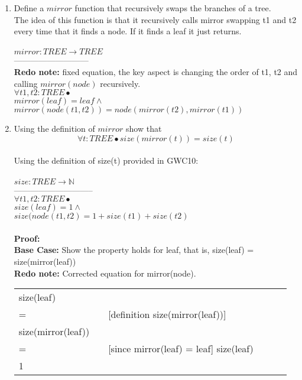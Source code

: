 \documentclass{article}
\begin{document}
\begin{enumerate}[\bf I.]
\begin{enumerate}
\item Define a $mirror$ function that recursively swaps the branches of a tree. \\
  The idea of this function is that it recursively calls mirror swapping t1 and t2 \\
  every time that it finds a node. If it finds a leaf it just returns. \\
  \\
  $ mirror: TREE \rightarrow TREE $\\
  --------------------------- \\
  \textbf{Redo note:} fixed equation, the key aspect is changing the order of t1, t2 and calling $mirror(node)$ recursively. \\
  $\forall t1,t2 : TREE \bullet$\\
  $mirror(leaf) = leaf \land$ \\
  $mirror(node(t1, t2)) = node(mirror(t2), mirror(t1))$ \\
\item Using the definition of $mirror$  show
that
\[\forall t: TREE \bullet size(mirror(t)) = size(t)\] \\
Using the definition of size(t) provided in GWC10: \\
\\
$ size: TREE \rightarrow \mathbb{N} $\\
----------------------------- \\
$ \forall t1,t2: TREE \bullet $\\
$ size (leaf) = 1 \land $\\
$ size (node(t1,t2) = 1 + size(t1) + size(t2) $ \\
\\
\textbf{Proof:}\\
\textbf{Base Case:} Show the property holds for leaf, that is, size(leaf) = size(mirror(leaf)) \\
\textbf{Redo note:} Corrected equation for mirror(node). \\
\begin{tabular}{l ll lll}
     size(leaf) &    &  \\
     = &   & [definition size(mirror(leaf))] \\
     size(mirror(leaf)) & &  \\
     = &  &  [since mirror(leaf) = leaf]
     size(leaf) &    &  \\
     1  &   & \\
\end{tabular} \\

\end{enumerate}
\end{enumerate}
\end{document}
